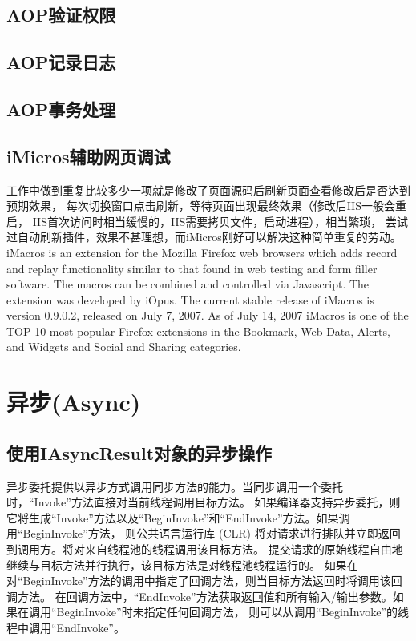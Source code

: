 \documentclass{book}
\begin{document}
\subsection{AOP验证权限}

\subsection{AOP记录日志}

\subsection{AOP事务处理}

\subsection{iMicros辅助网页调试}

工作中做到重复比较多少一项就是修改了页面源码后刷新页面查看修改后是否达到预期效果，
每次切换窗口点击刷新，等待页面出现最终效果（修改后IIS一般会重启，
IIS首次访问时相当缓慢的，IIS需要拷贝文件，启动进程），相当繁琐，
尝试过自动刷新插件，效果不甚理想，而iMicros刚好可以解决这种简单重复的劳动。
iMacros is an extension for the Mozilla Firefox web browsers 
which adds record and replay functionality similar to that 
found in web testing and form filler software. 
The macros can be combined and controlled via Javascript. 
The extension was developed by iOpus. 
The current stable release of iMacros is version 0.9.0.2, 
released on July 7, 2007. As of July 14, 
2007 iMacros is one of the TOP 10 most popular Firefox extensions in the Bookmark, 
Web Data, Alerts, and Widgets and Social and Sharing categories.

\section{异步(Async)}

\subsection{使用IAsyncResult对象的异步操作}

异步委托提供以异步方式调用同步方法的能力。当同步调用一个委托时，“Invoke”方法直接对当前线程调用目标方法。
如果编译器支持异步委托，则它将生成“Invoke”方法以及“BeginInvoke”和“EndInvoke”方法。如果调用“BeginInvoke”方法，
则公共语言运行库 (CLR) 将对请求进行排队并立即返回到调用方。将对来自线程池的线程调用该目标方法。
提交请求的原始线程自由地继续与目标方法并行执行，该目标方法是对线程池线程运行的。
如果在对“BeginInvoke”方法的调用中指定了回调方法，则当目标方法返回时将调用该回调方法。
在回调方法中，“EndInvoke”方法获取返回值和所有输入/输出参数。如果在调用“BeginInvoke”时未指定任何回调方法，
则可以从调用“BeginInvoke”的线程中调用“EndInvoke”。
\end{document}
